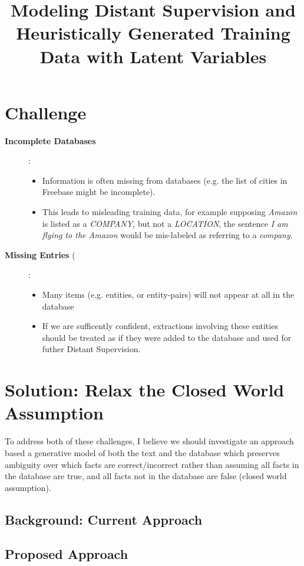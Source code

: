 \documentclass[12pt]{article}
\begin{document}
\date{}
\title{Modeling Distant Supervision and Heuristically Generated Training Data with Latent Variables}
\author{}
\maketitle



\section{Challenge}
\begin{description}
  \item[{\bf Incomplete Databases}]:
    \begin{itemize}
    \item Information is often missing from databases (e.g. the list of cities in Freebase might be incomplete).
    \item This leads to misleading training data, for example supposing \emph{Amazon} is listed as a {\sl COMPANY},
      but not a {\sl LOCATION}, the sentence \emph{I am flying to the Amazon} would be mis-labeled as referring
      to a {\sl company}.
    \end{itemize}
  \item[{\bf Missing Entries} (\emph{Semi-Supervised Distant Supervision)]:
    \begin{itemize}
      \item Many items (e.g. entities, or entity-pairs) will not appear at all in the database
      \item If we are sufficently confident, extractions involving these entities should be treated as if they were added to the database
        and used for futher Distant Supervision.
    \end{itemize}
\end{description}

\section{Solution: Relax the Closed World Assumption}
To address both of these challenges, I believe we should investigate an approach based a generative model of both the text and the database which
preserves ambiguity over which facts are correct/incorrect rather than assuming all facts in the database are true, and all facts not in the database
are false (closed world assumption).

\subsection{Background: Current Approach}


\subsection{Proposed Approach}
\end{document}
